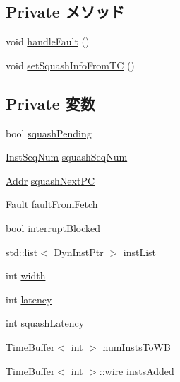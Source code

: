 \subsection*{Private メソッド}
\begin{DoxyCompactItemize}
\item 
void \hyperlink{classInorderBackEnd_acd8f81ae1aa6143073f58ab038f684f0}{handleFault} ()
\item 
void \hyperlink{classInorderBackEnd_a9f7604c717497f0c9b7f416b3265e085}{setSquashInfoFromTC} ()
\end{DoxyCompactItemize}
\subsection*{Private 変数}
\begin{DoxyCompactItemize}
\item 
bool \hyperlink{classInorderBackEnd_a2aafb6fc593b04986eeed845923a8953}{squashPending}
\item 
\hyperlink{inst__seq_8hh_a258d93d98edaedee089435c19ea2ea2e}{InstSeqNum} \hyperlink{classInorderBackEnd_a34292b1418c46ca63c892e7826510d77}{squashSeqNum}
\item 
\hyperlink{base_2types_8hh_af1bb03d6a4ee096394a6749f0a169232}{Addr} \hyperlink{classInorderBackEnd_aabe0c73b4678ef858d3363c9bed18906}{squashNextPC}
\item 
\hyperlink{classRefCountingPtr}{Fault} \hyperlink{classInorderBackEnd_a21a86a2f5f30b0f512909bdc8b2aae53}{faultFromFetch}
\item 
bool \hyperlink{classInorderBackEnd_ae2e3d2da6f5c26e7f0eca5784b6397d1}{interruptBlocked}
\item 
\hyperlink{classstd_1_1list}{std::list}$<$ \hyperlink{classInorderBackEnd_a028ce10889c5f6450239d9e9a7347976}{DynInstPtr} $>$ \hyperlink{classInorderBackEnd_ae10a391d02ce1ef67ee13cd82b7d46e5}{instList}
\item 
int \hyperlink{classInorderBackEnd_a2474a5474cbff19523a51eb1de01cda4}{width}
\item 
int \hyperlink{classInorderBackEnd_a9c5bf07170b5d91cfb44d4bfd0517128}{latency}
\item 
int \hyperlink{classInorderBackEnd_a440f8cda1481977c324a827c7c9f1e24}{squashLatency}
\item 
\hyperlink{classTimeBuffer}{TimeBuffer}$<$ int $>$ \hyperlink{classInorderBackEnd_a34cd6ffaeb59e3f95f2cc2aaf8eb7ecf}{numInstsToWB}
\item 
\hyperlink{classTimeBuffer}{TimeBuffer}$<$ int $>$::wire \hyperlink{classInorderBackEnd_a3bafa8bcab17d8f51c2b5fdf04679d47}{instsAdded}

\end{DoxyCompactItemize}
